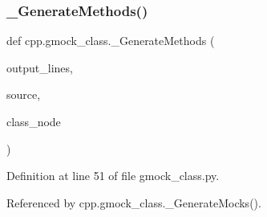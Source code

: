 \subsubsection{\texorpdfstring{\+\_\+\+Generate\+Methods()}{\_GenerateMethods()}}
{\footnotesize\ttfamily def cpp.\+gmock\+\_\+class.\+\_\+\+Generate\+Methods (\begin{DoxyParamCaption}\item[{}]{output\+\_\+lines,  }\item[{}]{source,  }\item[{}]{class\+\_\+node }\end{DoxyParamCaption})\hspace{0.3cm}{\ttfamily [private]}}



Definition at line 51 of file gmock\+\_\+class.\+py.



Referenced by cpp.\+gmock\+\_\+class.\+\_\+\+Generate\+Mocks().


